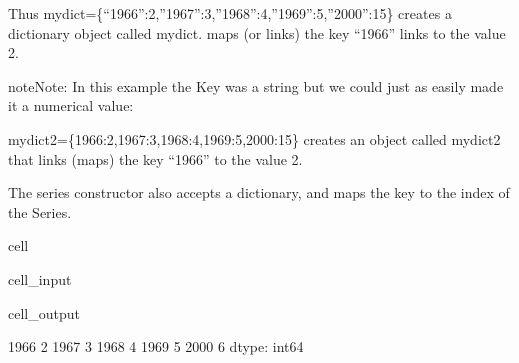\documentclass[letterpaper,10pt,english]{jupyterBook}
\begin{document}
\sphinxAtStartPar
Thus mydict=\{“1966”:2,”1967”:3,”1968”:4,”1969”:5,”2000”:\sphinxhyphen{}15\} creates a dictionary object called mydict.   maps (or links) the key “1966” links to the value 2.

\begin{sphinxadmonition}{note}{Note:}
\sphinxAtStartPar
In this example the Key was a string but we could just as easily made it a numerical value:
\end{sphinxadmonition}

\sphinxAtStartPar
mydict2=\{1966:2,1967:3,1968:4,1969:5,2000:\sphinxhyphen{}15\} creates an object called mydict2 that links (maps) the key “1966” to the value 2.

\sphinxAtStartPar
The series constructor also accepts a dictionary, and maps the key to the index of the Series.

\begin{sphinxuseclass}{cell}\begin{sphinxVerbatimInput}

\begin{sphinxuseclass}{cell_input}
\begin{sphinxVerbatim}[commandchars=\\\{\}]
\end{sphinxVerbatim}

\end{sphinxuseclass}\end{sphinxVerbatimInput}
\begin{sphinxVerbatimOutput}

\begin{sphinxuseclass}{cell_output}
\begin{sphinxVerbatim}[commandchars=\\\{\}]
1966    2
1967    3
1968    4
1969    5
2000    6
dtype: int64
\end{sphinxVerbatim}

\end{sphinxuseclass}\end{sphinxVerbatimOutput}

\end{sphinxuseclass}
\end{document}
